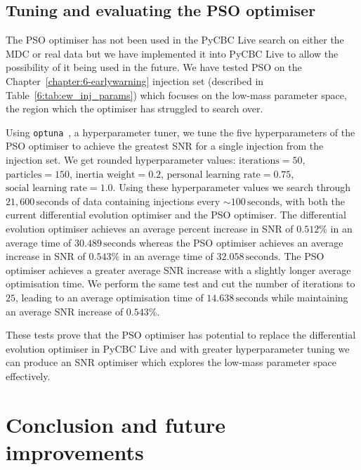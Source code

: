 \subsection{\label{7:sec:tuning-pso}Tuning and evaluating the PSO optimiser}

The PSO optimiser has not been used in the PyCBC Live search on either the MDC or real data but we have implemented it into PyCBC Live to allow the possibility of it being used in the future. We have tested PSO on the Chapter~\ref{chapter:6-earlywarning} injection set (described in Table~\ref{6:tab:ew_inj_params}) which focuses on the low-mass parameter space, the region which the optimiser has struggled to search over.

Using \texttt{optuna}~\cite{optuna:2019}, a hyperparameter tuner, we tune the five hyperparameters of the PSO optimiser to achieve the greatest SNR for a single \gwadj injection from the injection set. We get rounded hyperparameter values: $\text{iterations} = 50$, $\text{particles} = 150$, $\text{inertia weight} = 0.2$, $\text{personal learning rate} = 0.75$, $\text{social learning rate} = 1.0$. Using these hyperparameter values we search through $21,600 \, \text{seconds}$ of \gwadj data containing \gwadj injections every ${\sim}100 \, \text{seconds}$, with both the current differential evolution optimiser and the PSO optimiser. The differential evolution optimiser achieves an average percent increase in SNR of $0.512 \%$ in an average time of $30.489 \, \text{seconds}$ whereas the PSO optimiser achieves an average increase in SNR of $0.543\%$ in an average time of $32.058 \, \text{seconds}$. The PSO optimiser achieves a greater average SNR increase with a slightly longer average optimisation time. We perform the same test and cut the number of iterations to $25$, leading to an average optimisation time of  $14.638 \, \text{seconds}$ while maintaining an average SNR increase of $0.543\%$.

These tests prove that the PSO optimiser has potential to replace the differential evolution optimiser in PyCBC Live and with greater hyperparameter tuning we can produce an SNR optimiser which explores the low-mass parameter space effectively.

\section{\label{7:sec:conclusion}Conclusion and future improvements}

